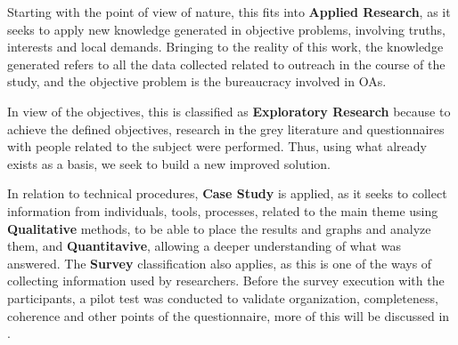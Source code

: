 
Starting with the point of view of nature, this fits into \textbf{Applied Research}, as it seeks to apply new knowledge generated in objective problems, involving truths, interests and local demands. 
Bringing to the reality of this work, the knowledge generated refers to all the data collected related to outreach in the course of the study, and the objective problem is the bureaucracy involved in \acp{OA}.


In view of the objectives, this is classified as \textbf{Exploratory Research} because to achieve the defined objectives, research in the grey literature and questionnaires with people related to the subject were performed. 
Thus, using what already exists as a basis, we seek to build a new improved solution.


In relation to technical procedures, \textbf{Case Study} is applied, as it seeks to collect information from individuals, tools, processes, related to the main theme using \textbf{Qualitative} methods, to be able to place the results and graphs and analyze them, and \textbf{Quantitavive}, allowing a deeper understanding of what was answered. 
The \textbf{Survey} classification also applies, as this is one of the ways of collecting information used by researchers. 
Before the survey execution with the participants, a pilot test was conducted to validate organization, completeness, coherence and other points of the questionnaire, more of this will be discussed in .

